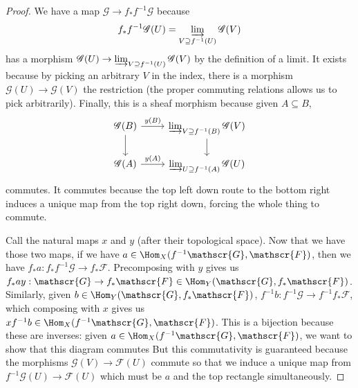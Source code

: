 \begin{proof}
	We have a map $\mathscr{G} \to f_\ast f^{-1} \mathscr{G} $ because
	\[
		f_\ast f^{-1}\mathscr{G}(U) = \varinjlim_{V \supseteq f^{-1}(U)} \mathscr{G}(V)
	\]
	has a morphism $\mathscr{G}(U) \to \varinjlim_{V \supseteq f^{-1}(U)} \mathscr{G}(V) $ by the definition of a limit.
	It exists because by picking an arbitrary $V $ in the index, there is a morphism $\mathscr{G}(U) \to \mathscr{G}(V) $ the restriction (the proper commuting relations allows us to pick arbitrarily).
	Finally, this is a sheaf morphism because given $A \subseteq B $,
	\[
	\begin{tikzcd}
	\mathscr{G}(B) & \varinjlim_{V \supseteq f^{-1}(B)} \mathscr{G}(V)\\
	\mathscr{G}(A) & \varinjlim_{U \supseteq f^{-1}(A)} \mathscr{G}(U)
	\arrow["y(B)",from=1-1,to=1-2]
	\arrow[from=1-1,to=2-1]
	\arrow["y(A)",from=2-1,to=2-2]
	\arrow[from=1-2,to=2-2]
	\end{tikzcd}
	\]
	commutes.
	It commutes because the top left down route to the bottom right induces a unique map from the top right down, forcing the whole thing to commute.

	Call the natural maps $x $ and $y $ (after their topological space).
	Now that we have those two maps, if we have $a \in \Hom_X(f^{-1}\mathscr{G},\mathscr{F}) $, then we have $f_\ast a: f_\ast f^{-1} \mathscr{G} \to f_\ast \mathscr{F} $.
	Precomposing with $y $ gives us $f_\ast a y: \mathscr{G} \to f_\ast \mathscr{F} \in \Hom_Y(\mathscr{G},f_\ast \mathscr{F}) $.
	Similarly, given $b \in \Hom_Y(\mathscr{G},f_\ast \mathscr{F})$, $f^{-1}b: f^{-1}\mathscr{G} \to f^{-1}f_\ast \mathscr{F}$, which composing with $x $ gives us $xf^{-1}b \in \Hom_X(f^{-1}\mathscr{G}, \mathscr{F})$.
	This is a bijection because these are inverses: given $a \in \Hom_X(f^{-1}\mathscr{G},\mathscr{F}) $,
	we want to show that this diagram commutes
	But this commutativity is guaranteed because the morphisms $\mathscr{G}(V) \to \mathscr{F}(U) $ commute so that we induce a unique map from $f^{-1}\mathscr{G}(U)\to \mathscr{F}(U) $ which must be $a $ and the top rectangle simultaneously.
\end{proof}

